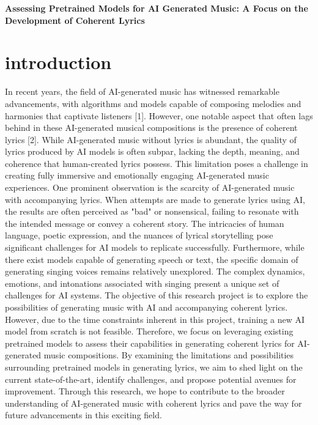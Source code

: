 \usepackage[utf8x]{inputenc} %
\usepackage{hyperref} %
\usepackage{graphicx} %


 

\begin{center}
    \LARGE{\textbf{Assessing Pretrained Models for AI Generated Music: A Focus on the Development of Coherent Lyrics}}\\[1.5ex]
\end{center}

\newpage 

\label{abstract}

\chapter{introduction}
\label{chap:introduction}

In recent years, the field of AI-generated music has witnessed remarkable advancements, with algorithms and models capable of composing melodies and harmonies that captivate listeners [1]. However, one notable aspect that often lags behind in these AI-generated musical compositions is the presence of coherent lyrics [2]. While AI-generated music without lyrics is abundant, the quality of lyrics produced by AI models is often subpar, lacking the depth, meaning, and coherence that human-created lyrics possess. This limitation poses a challenge in creating fully immersive and emotionally engaging AI-generated music experiences.
One prominent observation is the scarcity of AI-generated music with accompanying lyrics. When attempts are made to generate lyrics using AI, the results are often perceived as "bad" or nonsensical, failing to resonate with the intended message or convey a coherent story. The intricacies of human language, poetic expression, and the nuances of lyrical storytelling pose significant challenges for AI models to replicate successfully. 
Furthermore, while there exist models capable of generating speech or text, the specific domain of generating singing voices remains relatively unexplored. The complex dynamics, emotions, and intonations associated with singing present a unique set of challenges for AI systems.
The objective of this research project is to explore the possibilities of generating music with AI and accompanying coherent lyrics. However, due to the time constraints inherent in this project, training a new AI model from scratch is not feasible. Therefore, we focus on leveraging existing pretrained models to assess their capabilities in generating coherent lyrics for AI-generated music compositions. 
By examining the limitations and possibilities surrounding pretrained models in generating lyrics, we aim to shed light on the current state-of-the-art, identify challenges, and propose potential avenues for improvement. Through this research, we hope to contribute to the broader understanding of AI-generated music with coherent lyrics and pave the way for future advancements in this exciting field.

